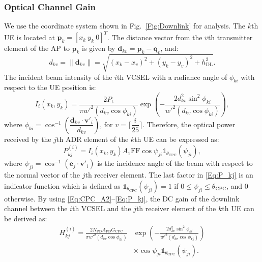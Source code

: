 \documentclass[lettersize,journal]{IEEEtran}
\begin{document}
\subsubsection{Optical Channel Gain}
We use the coordinate system shown in Fig.~\ref{Fig:Downlink} for analysis. The $k$th \ac{UE} is located at $\mathbf{p}_k=[x_k~y_k~0]^T$. The distance vector from the $v$th transmitter element of the \ac{AP} to $\mathbf{p}_k$ is given by $\mathbf{d}_{kv}=\mathbf{p}_k-\mathbf{q}_v$, and:
%
\begin{equation}
    d_{kv}=\lVert\mathbf{d}_{kv}\rVert=\sqrt{(x_k-x_v)^2+(y_k-y_v)^2+h_\mathrm{DL}^2}.
    \label{Eq:d_ku}
\end{equation}
%
The incident beam intensity of the $i$th \ac{VCSEL} with a radiance angle of $\phi_{ki}$ with respect to the \ac{UE} position is:
%
\begin{equation}
	I_i(x_k,y_k) = \frac{2P_\mathrm{t}}{\pi w'^2(d_{kv}\cos\phi_{ki})}{\exp{\left(-\frac{2d_{kv}^2\sin^2\phi_{ki}}{w'^2(d_{kv}\cos\phi_{ki})}\right)}},
    \label{Eq:I_v}
\end{equation}
%
where $\phi_{ki} = \cos^{-1}\left(\dfrac{\mathbf{d}_{kv}{\cdot}\mathbf{v}'_i}{d_{kv}}\right)$, for $v=\Big\lceil\dfrac{i}{25}\Big\rceil$.
%
Therefore, the optical power received by the $j$th \ac{ADR} element of the $k$th \ac{UE} can be expressed as:
%
\begin{equation}
    P_{kj}^{(i)} = I_i(x_k,y_k)A_1\mathrm{FF}\cos\psi_{ji}\mathds{1}_{\theta_\mathrm{CPC}}(\psi_{ji}),
    \label{Eq:P_kj}
\end{equation}
%
where $\psi_{ji}=\cos^{-1}(\mathbf{e}_j{\cdot}\mathbf{v}'_i)$ is the incidence angle of the beam with respect to the normal vector of the $j$th receiver element. The last factor in \eqref{Eq:P_kj} is an indicator function which is defined as $\mathds{1}_{\theta_\mathrm{CPC}}(\psi_{ji})=1$ if $0\leq\psi_{ji}\leq\theta_\mathrm{CPC}$, and $0$ otherwise. By using \eqref{Eq:CPC_A2}--\eqref{Eq:P_kj}, the \ac{DC} gain of the downlink channel between the $i$th \ac{VCSEL} and the $j$th receiver element of the $k$th \ac{UE} can be derived as: 
%
\begin{equation}
\begin{aligned}
    H_{kj}^{(i)} = \frac{2N_\mathrm{PD}A_\mathrm{PD}G_\mathrm{CPC}}{\pi w'^2(d_{kv}\cos\phi_{ki})}&{\exp{\left(-\frac{2d_{kv}^2\sin^2\phi_{ki}}{w'^2(d_{kv}\cos\phi_{ki})}\right)}} \\ 
    & \times \cos\psi_{ji}\mathds{1}_{\theta_\mathrm{CPC}}(\psi_{ji}).
\end{aligned}
\label{Eq:Hkj_i}
\end{equation}
\end{document}
